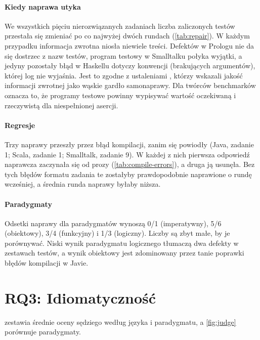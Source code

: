\paragraph{Kiedy naprawa utyka} We wszystkich pięciu nierozwiązanych zadaniach liczba zaliczonych
testów przestała się zmieniać po co najwyżej dwóch rundach (\cref{tab:repair}). W każdym przypadku
informacja zwrotna niosła niewiele treści. Defektów w Prologu nie da się dostrzec z nazw testów,
program testowy w Smalltalku połyka wyjątki, a jedyny pozostały błąd w Haskellu dotyczy konwencji
(brakujących argumentów), której log nie wyjaśnia. Jest to zgodne z ustaleniami
\citet{olausson2024selfrepair}, którzy wskazali jakość informacji zwrotnej jako wąskie gardło
samonaprawy. Dla twórców benchmarków oznacza to, że programy testowe powinny wypisywać wartość
oczekiwaną i rzeczywistą dla niespełnionej asercji.

\paragraph{Regresje} Trzy naprawy przeszły przez błąd kompilacji, zanim się powiodły (Java,
zadanie 1; Scala, zadanie 1; Smalltalk, zadanie 9). W każdej z nich pierwsza odpowiedź naprawcza
zaczynała się od prozy (\cref{tab:compile-errors}), a druga ją usunęła. Bez tych błędów formatu
zadania te zostałyby prawdopodobnie naprawione o rundę wcześniej, a średnia runda naprawy byłaby
niższa.

\paragraph{Paradygmaty} Odsetki naprawy dla paradygmatów wynoszą 0/1 (imperatywny), 5/6 (obiektowy),
3/4 (funkcyjny) i 1/3 (logiczny). Liczby są zbyt małe, by je porównywać. Niski wynik paradygmatu
logicznego tłumaczą dwa defekty w zestawach testów, a wynik obiektowy jest zdominowany przez tanie
poprawki błędów kompilacji w Javie.

\section{RQ3: Idiomatyczność}
\label{sec:results-idiomaticity}

 zestawia średnie oceny sędziego według języka i paradygmatu, a \cref{fig:judge}
porównuje paradygmaty.

